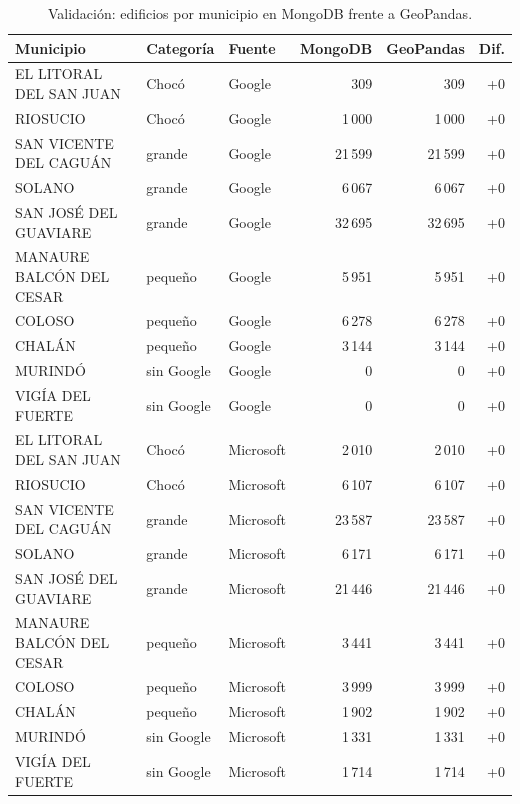 \begin{table}[H]
\centering\small
\caption{Validación: edificios por municipio en MongoDB frente a GeoPandas.}
\label{tab:validacion-asignacion}
\begin{tabular}{@{}lllrrr@{}}
\toprule
\textbf{Municipio} & \textbf{Categoría} & \textbf{Fuente} & \textbf{MongoDB} & \textbf{GeoPandas} & \textbf{Dif.} \\
\midrule
EL LITORAL DEL SAN JUAN & Chocó & Google & 309 & 309 & +0 \\
RIOSUCIO & Chocó & Google & 1\,000 & 1\,000 & +0 \\
SAN VICENTE DEL CAGUÁN & grande & Google & 21\,599 & 21\,599 & +0 \\
SOLANO & grande & Google & 6\,067 & 6\,067 & +0 \\
SAN JOSÉ DEL GUAVIARE & grande & Google & 32\,695 & 32\,695 & +0 \\
MANAURE BALCÓN DEL CESAR & pequeño & Google & 5\,951 & 5\,951 & +0 \\
COLOSO & pequeño & Google & 6\,278 & 6\,278 & +0 \\
CHALÁN & pequeño & Google & 3\,144 & 3\,144 & +0 \\
MURINDÓ & sin Google & Google & 0 & 0 & +0 \\
VIGÍA DEL FUERTE & sin Google & Google & 0 & 0 & +0 \\
EL LITORAL DEL SAN JUAN & Chocó & Microsoft & 2\,010 & 2\,010 & +0 \\
RIOSUCIO & Chocó & Microsoft & 6\,107 & 6\,107 & +0 \\
SAN VICENTE DEL CAGUÁN & grande & Microsoft & 23\,587 & 23\,587 & +0 \\
SOLANO & grande & Microsoft & 6\,171 & 6\,171 & +0 \\
SAN JOSÉ DEL GUAVIARE & grande & Microsoft & 21\,446 & 21\,446 & +0 \\
MANAURE BALCÓN DEL CESAR & pequeño & Microsoft & 3\,441 & 3\,441 & +0 \\
COLOSO & pequeño & Microsoft & 3\,999 & 3\,999 & +0 \\
CHALÁN & pequeño & Microsoft & 1\,902 & 1\,902 & +0 \\
MURINDÓ & sin Google & Microsoft & 1\,331 & 1\,331 & +0 \\
VIGÍA DEL FUERTE & sin Google & Microsoft & 1\,714 & 1\,714 & +0 \\
\bottomrule
\end{tabular}
\end{table}
